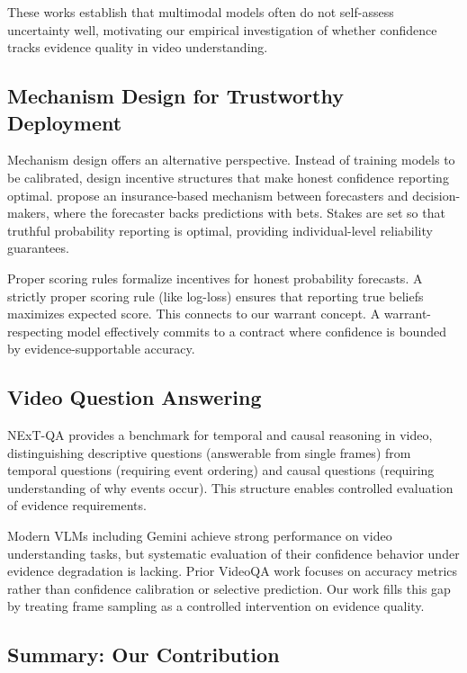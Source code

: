 \documentclass{article}
\begin{document}
These works establish that multimodal models often do not self-assess uncertainty well, motivating our empirical investigation of whether confidence tracks evidence quality in video understanding.

\subsection{Mechanism Design for Trustworthy Deployment}

Mechanism design offers an alternative perspective. Instead of training models to be calibrated, design incentive structures that make honest confidence reporting optimal. \citet{zhao2021mechanism} propose an insurance-based mechanism between forecasters and decision-makers, where the forecaster backs predictions with bets. Stakes are set so that truthful probability reporting is optimal, providing individual-level reliability guarantees.

Proper scoring rules \citep{gneiting2007scoring} formalize incentives for honest probability forecasts. A strictly proper scoring rule (like log-loss) ensures that reporting true beliefs maximizes expected score. This connects to our warrant concept. A warrant-respecting model effectively commits to a contract where confidence is bounded by evidence-supportable accuracy.

\subsection{Video Question Answering}

NExT-QA \citep{nextqa} provides a benchmark for temporal and causal reasoning in video, distinguishing descriptive questions (answerable from single frames) from temporal questions (requiring event ordering) and causal questions (requiring understanding of why events occur). This structure enables controlled evaluation of evidence requirements.

Modern VLMs including Gemini \citep{gemini2024} achieve strong performance on video understanding tasks, but systematic evaluation of their confidence behavior under evidence degradation is lacking. Prior VideoQA work focuses on accuracy metrics rather than confidence calibration or selective prediction. Our work fills this gap by treating frame sampling as a controlled intervention on evidence quality.

\subsection{Summary: Our Contribution}
\end{document}
